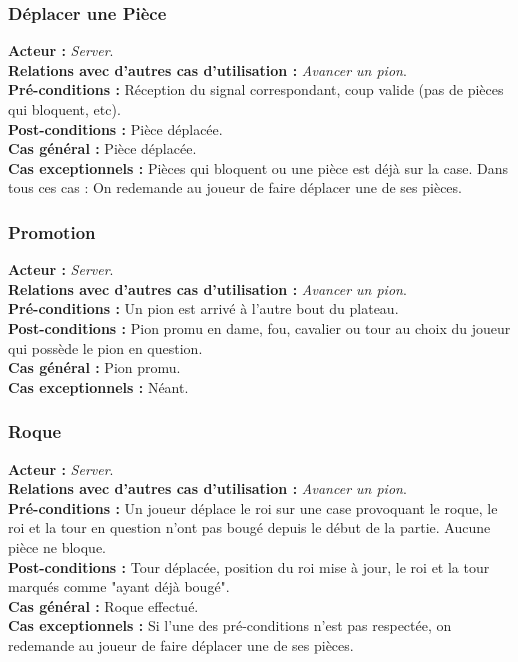\documentclass[10pt, a4paper]{article}
\begin{document}
\subsubsection{Déplacer une Pièce}
\textbf{Acteur :} \textit{Server}. \\
\textbf{Relations avec d'autres cas d'utilisation :} {\itshape Avancer un pion}. \\
\textbf{Pré-conditions :} Réception du signal correspondant, coup valide (pas de pièces qui bloquent, etc). \\
\textbf{Post-conditions :} Pièce déplacée. \\
\textbf{Cas général :} Pièce déplacée. \\
\textbf{Cas exceptionnels :} Pièces qui bloquent ou une pièce est déjà sur la case. Dans tous ces cas : On redemande au joueur de faire déplacer une de ses pièces. \\

\subsubsection{Promotion}
\textbf{Acteur :} \textit{Server}. \\
\textbf{Relations avec d'autres cas d'utilisation :} {\itshape Avancer un pion}. \\
\textbf{Pré-conditions :} Un pion est arrivé à l'autre bout du plateau. \\
\textbf{Post-conditions :} Pion promu en dame, fou, cavalier ou tour au choix du joueur qui possède le pion en question. \\
\textbf{Cas général :} Pion promu. \\
\textbf{Cas exceptionnels :} Néant. \\

\subsubsection{Roque}
\textbf{Acteur :} \textit{Server}. \\
\textbf{Relations avec d'autres cas d'utilisation :} {\itshape Avancer un pion}. \\
\textbf{Pré-conditions :} Un joueur déplace le roi sur une case provoquant le roque, le roi et la tour en question n'ont pas bougé depuis le début de la partie. Aucune pièce ne bloque. \\
\textbf{Post-conditions :} Tour déplacée, position du roi mise à jour, le roi et la tour marqués comme "ayant déjà bougé". \\
\textbf{Cas général :} Roque effectué. \\
\textbf{Cas exceptionnels :} Si l'une des pré-conditions n'est pas respectée, on redemande au joueur de faire déplacer une de ses pièces. \\
\end{document}
